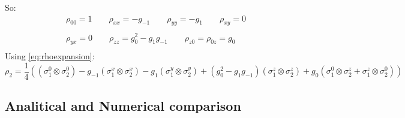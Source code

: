 \documentclass[10pt,a4paper]{article}
\begin{document}
	So:
	\begin{equation}\label{eq:coeff2sites}
	\begin{gathered}
	\rho_{00}=1 \qquad
	\rho_{xx}=-g_{-1} \qquad \rho_{yy}=-g_1 \qquad \rho_{xy}=0  \\
	\\ \rho_{yx}=0 \qquad
	\rho_{zz}=g_{0}^2-g_1g_{-1} \qquad \rho_{z0}=\rho_{0z}=g_0 \\
	\end{gathered}
	\end{equation}
	Using \ref{eq:rhoexpansion}:
	\begin{equation}\label{eq:rho2}
	\rho_2=\frac{1}{4}\left(\left(\sigma_1^0 \otimes\sigma_2^0\right)-g_{-1} \left(\sigma_1^x \otimes\sigma_2^x\right) - g_{1} \left(\sigma_1^y \otimes\sigma_2^y\right)+\left(g_{0}^2-g_1g_{-1}\right)\left(\sigma_1^z \otimes\sigma_2^z\right)+g_0\left(\sigma_1^0 \otimes\sigma_2^z+\sigma_1^z \otimes\sigma_2^0\right)\right)
	\end{equation}

	\subsection{Analitical and Numerical comparison}	
	
\end{document}
